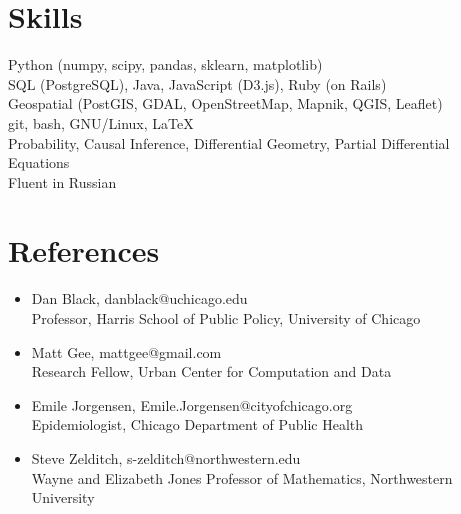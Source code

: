 \documentclass[margin,line]{resume}
\begin{document}
\begin{resume}




    \section{\mysidestyle Skills}
		Python (numpy, scipy, pandas, sklearn, matplotlib) \\
                SQL (PostgreSQL), Java, JavaScript (D3.js), Ruby (on Rails)\\
                Geospatial (PostGIS, GDAL, OpenStreetMap, Mapnik, QGIS, Leaflet)\\
                git, bash, GNU/Linux, \LaTeX\\
		Probability, Causal Inference, Differential Geometry, Partial Differential Equations\\
                Fluent in Russian
	\section{\mysidestyle References}
		\begin{itemize}

        \item Dan Black, danblack@uchicago.edu \\
                Professor, Harris School of Public Policy, University of Chicago
	\item Matt Gee, mattgee@gmail.com \\
		Research Fellow, Urban Center for Computation and Data 
	\item Emile Jorgensen, Emile.Jorgensen@cityofchicago.org \\
		Epidemiologist, Chicago Department of Public Health
	\item Steve Zelditch, s-zelditch@northwestern.edu \\
		Wayne and Elizabeth Jones Professor of Mathematics, Northwestern University 
		\end{itemize}
\end{resume}
\end{document}
